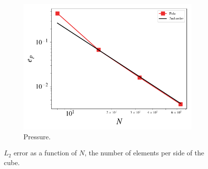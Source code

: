 \documentclass[10pt]{article}
\begin{document}
\begin{figure}
\begin{subfigure}[b]{0.49\textwidth}
    \includegraphics[width=\textwidth]{./p_error.png}%
    \caption{Pressure.}%
    \label{fig:}%
  \end{subfigure}\hfill%
  \caption{$L_2$ error as a function of $N$, the number of elements per side of the cube.}%
  \label{fig:results}%
\end{figure}%
\end{document}
